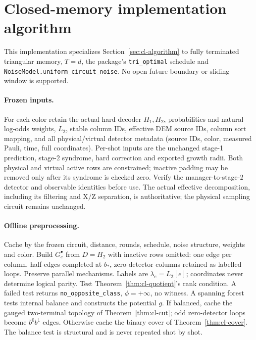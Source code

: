 \section{Closed-memory implementation algorithm}
\label{sec:cl-implementation}
This implementation specializes Section~\ref{sec:cl-algorithm} to fully
terminated triangular memory, $T=d$, the package's \texttt{tri\_optimal}
schedule and \texttt{NoiseModel.uniform\_circuit\_noise}.
No open future boundary or sliding window is supported.

\paragraph{Frozen inputs.}
For each color retain the actual hard-decoder $H_1,H_2$, probabilities and
natural-log-odds weights, $L_2$, stable column IDs, effective DEM source IDs,
column sort mapping, and all physical/virtual detector metadata (source IDs,
color, measured Pauli, time, full coordinates). Per-shot inputs are the
unchanged stage-1 prediction, stage-2 syndrome, hard correction and exported
growth radii. Both physical and virtual active rows are constrained;
inactive padding may be removed only after its syndrome is checked zero.
Verify the manager-to-stage-2 detector and observable identities before use.
The actual effective decomposition, including its filtering and X/Z separation,
is authoritative; the physical sampling circuit remains unchanged.

\paragraph{Offline preprocessing.}
Cache by the frozen circuit, distance, rounds, schedule, noise structure,
weights and color. Build $G_c^\bullet$ from $D=H_2$ with inactive rows omitted:
one edge per column, half-edges completed at $b_*$, zero-detector columns
retained as labelled loops. Preserve parallel mechanisms. Labels are
$\lambda_e=L_2[e]$; coordinates never determine logical parity.
Test Theorem~\ref{thm:cl-quotient}'s rank condition. A failed test returns
\texttt{no\_opposite\_class}, $\phi=+\infty$, no witness.
A spanning forest tests internal balance and constructs the potential $g$.
If balanced, cache the gauged two-terminal topology of
Theorem~\ref{thm:cl-cut}; odd zero-detector loops become $b^0b^1$ edges.
Otherwise cache the binary cover of Theorem~\ref{thm:cl-cover}.
The balance test is structural and is never repeated shot by shot.

